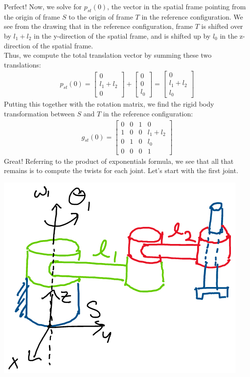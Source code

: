 \documentclass[oneside]{book}
\begin{document}
Perfect! Now, we solve for $p_{st}(0)$, the vector in the spatial frame pointing from the origin of frame $S$ to the origin of frame $T$ in the reference configuration. We see from the drawing that in the reference configuration, frame $T$ is shifted over by $l_1 + l_2$ in the y-direction of the spatial frame, and is shifted up by $l_0$ in the z-direction of the spatial frame.\\
Thus, we compute the total translation vector by summing these two translations:
\begin{align}
    p_{st}(0) = \begin{bmatrix}
        0\\
        l_1 + l_2\\
        0
    \end{bmatrix}
    + 
    \begin{bmatrix}
        0\\
        0\\
        l_0
    \end{bmatrix}
     = \begin{bmatrix}
         0\\
         l_1 + l_2\\
         l_0
     \end{bmatrix}
\end{align}
Putting this together with the rotation matrix, we find the rigid body transformation between $S$ and $T$ in the reference configuration:
\begin{align}
    g_{st}(0) = 
    \begin{bmatrix}
        0 & 0 & 1 & 0\\
        1 & 0 & 0 & l_1 + l_2\\
        0 & 1 & 0 & l_0\\
        0 & 0 & 0 & 1
    \end{bmatrix}
\end{align}
Great! Referring to the product of exponentials formula, we see that all that remains is to compute the twists for each joint. Let's start with the first joint.
\begin{center}
    \includegraphics[scale=0.3]{images/firstJoint.png}
\end{center}
\end{document}
